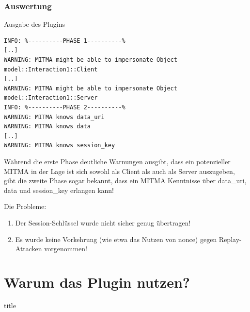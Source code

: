 \begin{frame}[c,fragile]

	\frametitle{Auswertung}

\begin{block}{Ausgabe des Plugins}
\tiny{
\begin{verbatim}
INFO: %----------PHASE 1----------%
[..]
WARNING: MITMA might be able to impersonate Object model::Interaction1::Client
[..]
WARNING: MITMA might be able to impersonate Object model::Interaction1::Server
INFO: %----------PHASE 2----------%
WARNING: MITMA knows data_uri
WARNING: MITMA knows data
[..]
WARNING: MITMA knows session_key
\end{verbatim}
}
\end{block}

	Während die erste Phase deutliche Warnungen ausgibt, dass ein potenzieller MITMA in der Lage ist 
	sich sowohl als Client als auch als Server auszugeben, gibt die zweite Phase sogar bekannt, dass 
	ein MITMA Kenntnisse über data\_uri, data und session\_key erlangen kann!
	
	Die Probleme: 
		\begin{enumerate}
			\item Der Session-Schlüssel wurde nicht sicher genug übertragen!
			\item Es wurde keine Vorkehrung (wie etwa das Nutzen von nonce) gegen Replay-Attacken vorgenommen!
		\end{enumerate}
\end{frame}


\section{Warum das Plugin nutzen?}

\begin{frame}[c]
  \vfill
  \centering
  \begin{beamercolorbox}[sep=6pt,center,shadow=true,rounded=true]{title}
    \textbf{\Large{\insertsectionhead}}\par%
  \end{beamercolorbox}
  \vfill
\end{frame}


